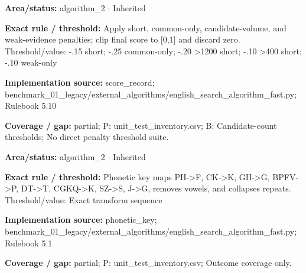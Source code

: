 \begin{tcolorbox}[enhanced,breakable,colback=white,colframe=Muted!45,boxrule=0.45pt,arc=1.5pt,left=6pt,right=6pt,top=5pt,bottom=5pt,title={\texttt{A2-PENALTIES-12}},title after break={\texttt{A2-PENALTIES-12}\ (continued)},fonttitle=\headingfont\bfseries\color{Navy},coltitle=Navy]
\textbf{Area/status:} algorithm\_\allowbreak{}2 $\boldsymbol{\cdot}$ Inherited\par
\smallskip
\textbf{Exact rule / threshold:} Apply short, common-only, candidate-volume, and weak-evidence penalties; clip final score to [0,1] and discard zero. Threshold/\allowbreak{}value: -.15 short; -.25 common-only; -.20 >1200 short; -.10 >400 short; -.10 weak-only\par
\smallskip
\textbf{Implementation source:} score\_\allowbreak{}record; benchmark\_\allowbreak{}01\_\allowbreak{}legacy/\allowbreak{}external\_\allowbreak{}algorithms/\allowbreak{}english\_\allowbreak{}search\_\allowbreak{}algorithm\_\allowbreak{}fast.py; Rulebook 5.10\par
\smallskip
\textbf{Coverage / gap:} partial; P: unit\_\allowbreak{}test\_\allowbreak{}inventory.csv; B: Candidate-count thresholds; No direct penalty threshold suite.
\end{tcolorbox}
\begin{tcolorbox}[enhanced,breakable,colback=white,colframe=Muted!45,boxrule=0.45pt,arc=1.5pt,left=6pt,right=6pt,top=5pt,bottom=5pt,title={\texttt{A2-PHONETIC-03}},title after break={\texttt{A2-PHONETIC-03}\ (continued)},fonttitle=\headingfont\bfseries\color{Navy},coltitle=Navy]
\textbf{Area/status:} algorithm\_\allowbreak{}2 $\boldsymbol{\cdot}$ Inherited\par
\smallskip
\textbf{Exact rule / threshold:} Phonetic key maps PH->F, CK->K, GH->G, BPFV->P, DT->T, CGKQ->K, SZ->S, J->G, removes vowels, and collapses repeats. Threshold/\allowbreak{}value: Exact transform sequence\par
\smallskip
\textbf{Implementation source:} phonetic\_\allowbreak{}key; benchmark\_\allowbreak{}01\_\allowbreak{}legacy/\allowbreak{}external\_\allowbreak{}algorithms/\allowbreak{}english\_\allowbreak{}search\_\allowbreak{}algorithm\_\allowbreak{}fast.py; Rulebook 5.1\par
\smallskip
\textbf{Coverage / gap:} partial; P: unit\_\allowbreak{}test\_\allowbreak{}inventory.csv; Outcome coverage only.
\end{tcolorbox}
